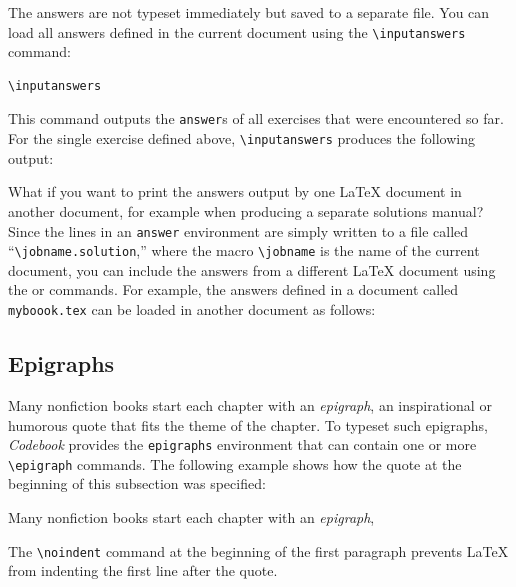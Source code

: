 \documentclass[minted]{codebook}
\begin{document}
The answers are not typeset immediately but saved to a separate file.
You can load all answers defined in the current document using the \verb|\inputanswers| command:
\begin{lst*}{}
\begin{verbatim}
\inputanswers
\end{verbatim}
\end{lst*}
This command outputs the \verb|answer|s of all exercises that were encountered so far.
For the single exercise defined above, \verb|\inputanswers| produces the following output:

What if you want to print the answers output by one \LaTeX{} document in another document, for example when producing a separate solutions manual?
Since the lines in an \verb|answer| environment are simply written to a file called ``\verb|\jobname.solution|,'' where the macro \verb|\jobname| is the name of the current document, you can include the answers from a different \LaTeX{} document using the \verb|| or \verb|| commands.
For example, the answers defined in a document called \verb|myboook.tex| can be loaded in another document as follows:
\begin{texcode}

\end{texcode}


\subsection{Epigraphs}


\noindent Many nonfiction books start each chapter with an \emph{epigraph},
an inspirational or humorous quote that fits the theme of the chapter.
To typeset such epigraphs, \emph{Codebook} provides the \verb|epigraphs| environment that can contain one or more \verb|\epigraph| commands.
The following example shows how the quote at the beginning of this subsection was specified:
\begin{texcode}
\noindent Many nonfiction books start each chapter with an \emph{epigraph},
\end{texcode}
The \verb|\noindent| command at the beginning of the first paragraph prevents \LaTeX{} from indenting the first line after the quote.
\end{document}
